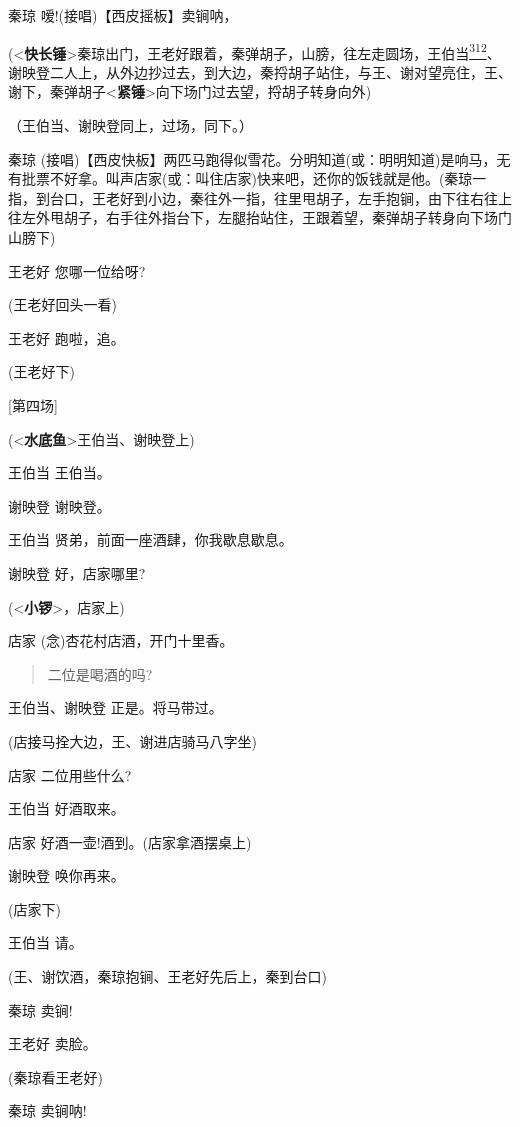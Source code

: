 秦琼 嗳!(接唱)【西皮摇板】卖锏呐，

(\textless{}\textbf{快长锤}\textgreater{}秦琼出门，王老好跟着，秦弹胡子，山膀，往左走圆场，王伯当\protect\hyperlink{fn312}{\textsuperscript{312}}、谢映登二人上，从外边抄过去，到大边，秦捋胡子站住，与王、谢对望亮住，王、谢下，秦弹胡子\textless{}\textbf{紧锤}\textgreater{}向下场门过去望，捋胡子转身向外)

（王伯当、谢映登同上，过场，同下。）

秦琼
(接唱)【西皮快板】两匹马跑得似雪花。分明知道(或：明明知道)是响马，无有批票不好拿。叫声店家(或：叫住店家)快来吧，还你的饭钱就是他。(秦琼一指，到台口，王老好到小边，秦往外一指，往里甩胡子，左手抱锏，由下往右往上往左外甩胡子，右手往外指台下，左腿抬站住，王跟着望，秦弹胡子转身向下场门山膀下)

王老好 您哪一位给呀?

(王老好回头一看)

王老好 跑啦，追。

(王老好下)

{[}第四场{]}

(\textless{}\textbf{水底鱼}\textgreater{}王伯当、谢映登上)

王伯当 王伯当。

谢映登 谢映登。

王伯当 贤弟，前面一座酒肆，你我歇息歇息。

谢映登 好，店家哪里?

(\textless{}\textbf{小锣}\textgreater{}，店家上)

店家 (念)杏花村店酒，开门十里香。

\begin{quote}
二位是喝酒的吗?
\end{quote}

王伯当、谢映登 正是。将马带过。

(店接马拴大边，王、谢进店骑马八字坐)

店家 二位用些什么?

王伯当 好酒取来。

店家 好酒一壶!酒到。(店家拿酒摆桌上)

谢映登 唤你再来。

(店家下)

王伯当 请。

(王、谢饮酒，秦琼抱锏、王老好先后上，秦到台口)

秦琼 卖锏!

王老好 卖脸。

(秦琼看王老好)

秦琼 卖锏呐!

